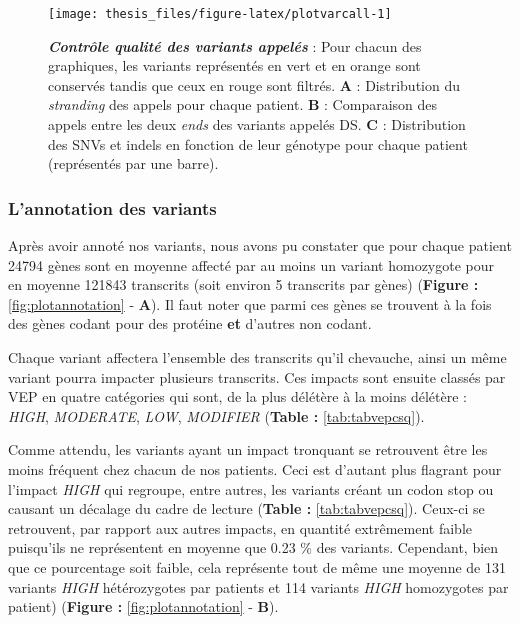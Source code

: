 \documentclass[12pt,twoside]{ugathesis}
\begin{document}
\newpage

\begin{figure}

{\centering \texttt{[image: thesis\_files/figure-latex/plotvarcall-1]} 

}

\caption[Contrôle qualité des variants appelés]{\textbf{\emph{Contrôle qualité des variants appelés}}
: Pour chacun des graphiques, les variants représentés en vert et en
orange sont conservés tandis que ceux en rouge sont filtrés. \textbf{A}
: Distribution du \emph{stranding} des appels pour chaque patient.
\textbf{B} : Comparaison des appels entre les deux \emph{ends} des
variants appelés DS. \textbf{C} : Distribution des SNVs et indels en
fonction de leur génotype pour chaque patient (représentés par une
barre).}\label{fig:plotvarcall}
\end{figure}










\newpage

\subsubsection{L'annotation des
variants}\label{lannotation-des-variants}

Après avoir annoté nos variants, nous avons pu constater que pour chaque
patient 24794 gènes sont en moyenne affecté par au moins un variant
homozygote pour en moyenne 121843 transcrits (soit environ 5 transcrits
par gènes) (\textbf{Figure : }\ref{fig:plotannotation} - \textbf{A}). Il
faut noter que parmi ces gènes se trouvent à la fois des gènes codant
pour des protéine \textbf{et} d'autres non codant.

Chaque variant affectera l'ensemble des transcrits qu'il chevauche,
ainsi un même variant pourra impacter plusieurs transcrits. Ces impacts
sont ensuite classés par VEP en quatre catégories qui sont, de la plus
délétère à la moins délétère : \emph{HIGH}, \emph{MODERATE}, \emph{LOW},
\emph{MODIFIER} (\textbf{Table : }\ref{tab:tabvepcsq}).

Comme attendu, les variants ayant un impact tronquant se retrouvent être
les moins fréquent chez chacun de nos patients. Ceci est d'autant plus
flagrant pour l'impact \emph{HIGH} qui regroupe, entre autres, les
variants créant un codon stop ou causant un décalage du cadre de lecture
(\textbf{Table : }\ref{tab:tabvepcsq}). Ceux-ci se retrouvent, par
rapport aux autres impacts, en quantité extrêmement faible puisqu'ils ne
représentent en moyenne que 0.23 \% des variants. Cependant, bien que ce
pourcentage soit faible, cela représente tout de même une moyenne de 131
variants \emph{HIGH} hétérozygotes par patients et 114 variants
\emph{HIGH} homozygotes par patient) (\textbf{Figure :
}\ref{fig:plotannotation} - \textbf{B}).
\end{document}
